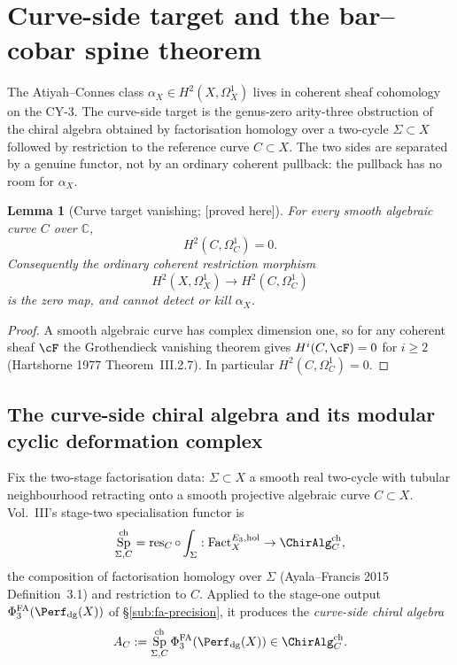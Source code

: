 \documentclass[11pt,reqno]{amsart}
\theoremstyle{plain}
\newtheorem{lemma}[theorem]{Lemma}
\theoremstyle{definition}
\theoremstyle{remark}
\providecommand{\ClaimStatusProvedHere}{\textnormal{[proved here]}}
\DeclareMathOperator{\Sp}{Sp}
\newcommand{\Cbb}{\mathbb{C}}
\begin{document}
\section{Curve-side target and the bar--cobar spine theorem}
\label{sec:spine}

The Atiyah--Connes class $\alpha_X\in H^2(X,\Omega^1_X)$ lives in
coherent sheaf cohomology on the CY-$3$. The curve-side target is the
genus-zero arity-three obstruction of the chiral algebra obtained by
factorisation homology over a two-cycle $\Sigma\subset X$ followed by
restriction to the reference curve $C\subset X$. The two sides are
separated by a genuine functor, not by an ordinary coherent pullback:
the pullback has no room for $\alpha_X$.

\begin{lemma}[Curve target vanishing; \ClaimStatusProvedHere]
\label{lem:curve-h2-omega-vanishes}
For every smooth algebraic curve $C$ over $\Cbb$,
\[
  H^2(C,\Omega_C^1)=0.
\]
Consequently the ordinary coherent restriction morphism
\[
  H^2(X,\Omega_X^1)\to H^2(C,\Omega_C^1)
\]
is the zero map, and cannot detect or kill $\alpha_X$.
\end{lemma}

\begin{proof}
A smooth algebraic curve has complex dimension one, so for any
coherent sheaf $\cF$ the Grothendieck vanishing theorem gives
$H^i(C,\cF)=0$ for $i\geq 2$ (Hartshorne 1977 Theorem~III.2.7). In
particular $H^2(C,\Omega_C^1)=0$.
\end{proof}

\subsection{The curve-side chiral algebra and its modular cyclic deformation complex}

Fix the two-stage factorisation data: $\Sigma\subset X$ a smooth real
two-cycle with tubular neighbourhood retracting onto a smooth
projective algebraic curve $C\subset X$. Vol.~III's stage-two
specialisation functor is
\[
  \Sp^{\mathrm{ch}}_{\Sigma,C}
  =\operatorname{res}_C\circ\int_\Sigma
  :\operatorname{Fact}^{E_3,\mathrm{hol}}_X
  \to\ChirAlg^{\mathrm{ch}}_C,
\]
the composition of factorisation homology over $\Sigma$
(Ayala--Francis 2015 Definition~3.1) and restriction to $C$. Applied
to the stage-one output $\Phi^{\mathrm{FA}}_3(\Perf_{\mathrm{dg}}(X))$
of \S\ref{sub:fa-precision}, it produces the \emph{curve-side chiral
algebra}
\[
  A_C
  :=\Sp^{\mathrm{ch}}_{\Sigma,C}
  \Phi^{\mathrm{FA}}_3(\Perf_{\mathrm{dg}}(X))
  \in\ChirAlg^{\mathrm{ch}}_C.
\]
\end{document}
